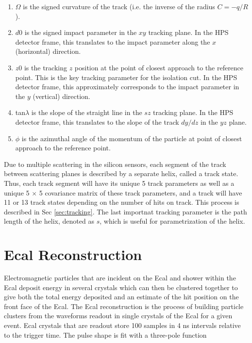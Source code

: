 \begin{enumerate}
  \item $\Omega$ is the signed curvature of the track (i.e. the inverse of the radius $C=-q/R$).
  \item $d0$ is the signed impact parameter in the $xy$ tracking plane. In the HPS detector frame, this translates to the impact parameter along the $x$ (horizontal) direction.
  \item $z0$ is the tracking $z$ position at the point of closest approach to the reference point. This is the key tracking parameter for the isolation cut. In the HPS detector frame, this approximately corresponds to the impact parameter in the $y$ (vertical) direction.
  \item tan$\lambda$ is the slope of the straight line in the $sz$ tracking plane. In the HPS detector frame, this translates to the slope of the track $dy/dz$ in the $yz$ plane.
  \item $\phi$ is the azimuthal angle of the momentum of the particle at point of closest approach to the reference point.
\end{enumerate}

Due to multiple scattering in the silicon sensors, each segment of the track between scattering planes is described by a separate helix, called a track state. Thus, each track segment will have its unique 5 track parameters as well as a unique 5 $\times$ 5 covariance matrix of these track parameters, and a track will have 11 or 13 track states depending on the number of hits on track. This process is described in Sec \ref{sec:tracking}. The last importnat tracking parameter is the path length of the helix, denoted as $s$, which is useful for parametrization of the helix.

\section{Ecal Reconstruction}\label{sec:ecal_recon}

Electromagnetic particles that are incident on the Ecal and shower within the Ecal deposit energy in several crystals which can then be clustered together to give both the total energy deposited and an estimate of the hit position on the front face of the Ecal. The Ecal reconstruction is the process of building particle clusters from the waveforms readout in single crystals of the Ecal for a given event. Ecal crystals that are readout store 100 samples in 4 ns intervals relative to the trigger time. The pulse shape is fit with a three-pole function 

